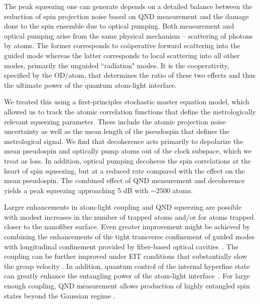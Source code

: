 \documentclass[preprint, aps,pra,onecolumn]{revtex4-1} %
\begin{document}
The peak squeezing one can generate depends on a detailed balance between the reduction of spin projection noise based on QND measurement and the damage done to the spin ensemble due to optical pumping.  
Both measurement and optical pumping arise from the same physical mechanism -- scattering of photons by atoms.  
The former corresponds to co\"{o}perative forward scattering into the guided mode whereas the latter corresponds to local scattering into all other modes, primarily the unguided ``radiation" modes.   
It is the cooperativity, specified by the OD/atom, that determines the ratio of these two effects and thus the ultimate power of the quantum atom-light interface. 

We treated this using a first-principles stochastic master equation model, which allowed us to track the atomic correlation functions that define the metrologically relevant squeezing parameter.  
These include the atomic projection noise uncertainty as well as the mean length of the pseudospin that defines the metrological signal.  
We find that decoherence acts primarily to depolarize the mean pseudospin and optically pump atoms out of the clock subspace, which we treat as loss.  In addition, optical pumping decoheres the spin correlations at the heart of spin squeezing, but at a reduced rate compared with the effect on the mean pseudospin.  
The combined effect of QND measurement and decoherence yields a peak squeezing approaching 5 dB with $\sim 2500$ atoms. 



Larger enhancements in atom-light coupling and QND squeezing are possible with modest increases in the number of trapped atoms and/or for atoms trapped closer to the nanofiber surface.  
Even greater improvement might be achieved by combining the enhancements of the tight transverse confinement of guided modes with longitudinal confinement provided by fiber-based optical cavities~\cite{le_kien_intracavity_2009, wuttke_nanofiber_2012, yalla_cavity_2014, bohnet_reduced_2014,nayak_optical_2014}.  
The coupling can be further improved under EIT conditions that substantially slow the group velocity \cite{gouraud_demonstration_2015, sayrin_storage_2015, kumar_autler-townes_2015, le_kien_electromagnetically_2015}. 
In addition, quantum control of the internal hyperfine state \cite{smith_quantum_2013-1} can greatly enhance the entangling power of the atom-light interface~\cite{trail_strongly_2010, norris_enhanced_2012}. 
For large enough coupling, QND measurement allows production of highly entangled spin states beyond the Gaussian regime \cite{stockton_deterministic_2004, mcconnell_entanglement_2015}.
\end{document}
